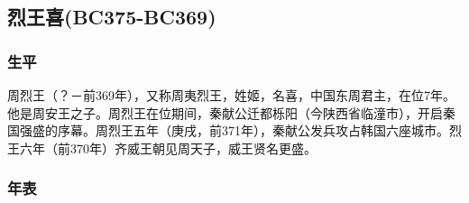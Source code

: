 
\subsection{烈王喜{\tiny(BC375-BC369)}}

\subsubsection{生平}

周烈王（？－前369年），又称周夷烈王，姓姬，名喜，中国东周君主，在位7年。他是周安王之子。周烈王在位期间，秦献公迁都栎阳（今陕西省临潼市），开启秦国强盛的序幕。周烈王五年（庚戌，前371年），秦献公发兵攻占韩国六座城市。烈王六年（前370年）齐威王朝见周天子，威王贤名更盛。

\subsubsection{年表}

